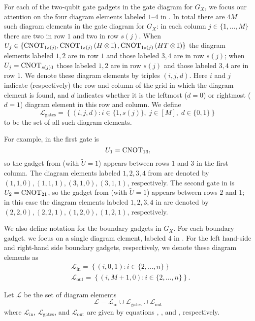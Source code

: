 \documentclass[../thesis-main/thesis-main]{subfiles}
\begin{document}
For each of the two-qubit gate gadgets in the gate diagram for $G_X$, we focus our attention on the four diagram elements labeled $1$--$4$ in . In total there are $4M$ such diagram elements in the gate diagram for $G_X$: in each column $j\in\{1,\ldots,M\}$ there are two in row $1$ and two in row $s(j)$. When $U_j\in\{\mathrm{CNOT}_{1s(j)},\mathrm{CNOT}_{1s(j)}\left(H\otimes\mathbb{I}\right),\mathrm{CNOT}_{1s(j)}\left(HT\otimes\mathbb{I}\right)\}$ the diagram elements labeled $1,2$ are in row $1$ and those labeled $3,4$ are in row $s(j)$; when $U_j=\mathrm{CNOT}_{s(j) 1}$ those labeled $1,2$ are in row $s(j)$ and those labeled $3,4$ are in row $1$. We denote these diagram elements by triples $(i,j,d)$. Here $i$ and $j$ indicate (respectively) the row and column of the grid in which the diagram element is found, and $d$ indicates whether it is the leftmost ($d=0$) or rightmost ($d=1$) diagram element in this row and column. We define 
\begin{equation}
\mathcal{L}_{\mathrm{gates}}=\left\{ \left(i,j,d\right)\colon i\in\{1,s(j)\},\; j\in[M],\; d\in\{0,1\}\right\} \label{eq:L_gates}
\end{equation}
to be the set of all such diagram elements.

For example, in  the first gate is 
\[
  U_1=\mathrm{CNOT}_{13},
\]
so the gadget from  (with $\tilde U=1$) appears between rows $1$ and $3$ in the first column. The diagram elements labeled $1,2,3,4$ from  are denoted by $(1,1,0), (1,1,1), (3,1,0), (3,1,1)$, respectively. The second gate in  is $U_2=\mathrm{CNOT}_{21}$, so the gadget from  (with $\tilde U=1$) appears between rows $2$ and $1$; in this case the diagram elements labeled $1,2,3,4$ in  are denoted by $(2,2,0),(2,2,1),(1,2,0),(1,2,1)$, respectively.

We also define notation for the boundary gadgets in $G_X$. For each boundary gadget. we focus on a single diagram element, labeled $4$ in . For the left hand-side and right-hand side boundary gadgets, respectively, we denote these diagram elements as
\begin{align}
 & \mathcal{L}_{\text{in}}=\left\{ (i,0,1)\colon i\in\{2,\ldots,n\}\right\} \label{eq:L_in}\\
 & \mathcal{L}_{\text{out}}=\left\{ (i,M+1,0)\colon i\in\{2,\ldots,n\}\right\} .\label{eq:L_out}
\end{align}
 
\begin{definition}
\label{defn:scriptL}Let $\mathcal{L}$ be the set of diagram
elements
\[
\mathcal{L}=\mathcal{L}_{\text{in}}\cup\mathcal{L}_{\mathrm{gates}}\cup\mathcal{L}_{\text{out}}
\]
where $\mathcal{L}_{\text{in}}$, $\mathcal{L}_{\mathrm{gates}}$, and $\mathcal{L}_{\text{out}}$ are given by equations , , and , respectively.
\end{definition}
\end{document}
